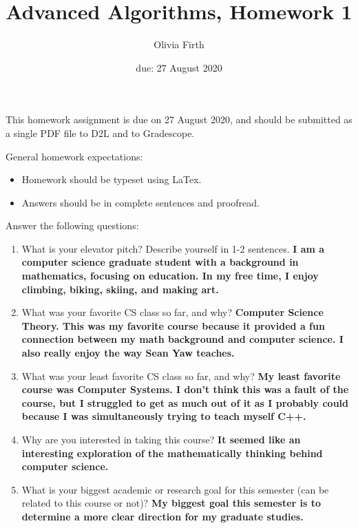 \documentclass{article}
\title{Advanced Algorithms, Homework 1}
\author{Olivia Firth}
\date{due: 27 August 2020}
\begin{document}
\maketitle

This homework assignment is due on 27 August 2020, and should be
submitted as a single PDF file to D2L and to Gradescope.

General homework expectations:
\begin{itemize}
    \item Homework should be typeset using LaTex.
    \item Answers should be in complete sentences and proofread.
\end{itemize}

\nextprob
{}

Answer the following questions:
\begin{enumerate}
    \item What is your elevator pitch?  Describe yourself in 1-2
                sentences.
                \newline \textbf{I am a computer science graduate student with a background in mathematics, focusing on education. In my free time, I enjoy 
                climbing, biking, skiing, and making art.}
    \item What was your favorite CS class so far, and why?
    \newline \textbf{Computer Science Theory. This was my favorite course because it provided a fun connection 
    between my math background and computer science. I also really enjoy the way Sean Yaw teaches. }
    \item What was your least favorite CS class so far, and why?
    \newline \textbf{My least favorite course was Computer Systems. I don't think this was a fault of the course, but I struggled 
    to get as much out of it as I probably could because I was simultaneously trying to teach myself C++.}
    \item Why are you interested in taking this course?
    \newline \textbf{It seemed like an interesting exploration of the mathematically thinking behind computer science.}
    \item What is your biggest academic or research goal for this semester (can
        be related to this course or not)?
        \newline \textbf{My biggest goal this semester is to determine a more clear direction for my graduate studies.}

\end{enumerate}
\end{document}
